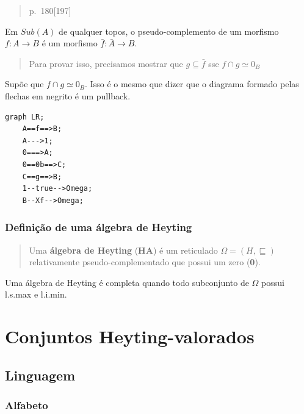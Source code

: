 \begin{quote}
p.~180{[}197{]}
\end{quote}

Em \(Sub(A)\) de qualquer topos, o pseudo-complemento de um morfismo
\(f : A \rightarrow B\) é um morfismo
\(\bar{f} : \bar{A} \rightarrow B\).

\begin{quote}
Para provar isso, precisamos mostrar que \(g \subseteq \bar{f}\) sse
\(f \cap g \simeq 0_B\)
\end{quote}

Supõe que \(f \cap g \simeq 0_B\). Isso é o mesmo que dizer que o
diagrama formado pelas flechas em negrito é um pullback.

\begin{verbatim}
graph LR;
    A==f==>B;
    A--->1;
    0===>A;
    0==0b==>C;
    C==g==>B;
    1--true-->Omega;
    B--Xf-->Omega;
\end{verbatim}

\hypertarget{definiuxe7uxe3o-de-uma-uxe1lgebra-de-heyting}{%
\subsubsection{Definição de uma álgebra de
Heyting}\label{definiuxe7uxe3o-de-uma-uxe1lgebra-de-heyting}}

\begin{quote}
Uma \textbf{álgebra de Heyting} (\textbf{HA}) é um reticulado
\(\Omega = (H, \sqsubseteq)\) relativamente pseudo-complementado que
possui um zero (\textbf{0}).
\end{quote}

Uma álgebra de Heyting é completa quando todo subconjunto de \(\Omega\)
possui l.s.max e l.i.min.

\hypertarget{conjuntos-heyting-valorados}{%
\section{Conjuntos
Heyting-valorados}\label{conjuntos-heyting-valorados}}

\hypertarget{linguagem}{%
\subsection{Linguagem}\label{linguagem}}

\hypertarget{alfabeto}{%
\subsubsection{Alfabeto}\label{alfabeto}}


